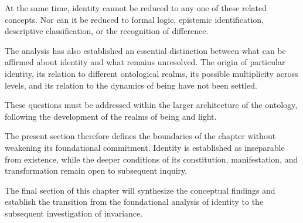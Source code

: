 At the same time, identity cannot be reduced to any one of these related concepts. Nor can it be reduced to formal logic, epistemic identification, descriptive classification, or the recognition of difference.

The analysis has also established an essential distinction between what can be affirmed about identity and what remains unresolved. The origin of particular identity, its relation to different ontological realms, its possible multiplicity across levels, and its relation to the dynamics of being have not been settled.

These questions must be addressed within the larger architecture of the ontology, following the development of the realms of being and light.

The present section therefore defines the boundaries of the chapter without weakening its foundational commitment. Identity is established as inseparable from existence, while the deeper conditions of its constitution, manifestation, and transformation remain open to subsequent inquiry.

The final section of this chapter will synthesize the conceptual findings and establish the transition from the foundational analysis of identity to the subsequent investigation of invariance.
